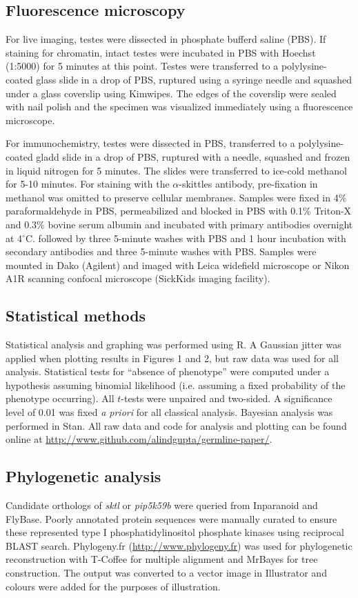 \documentclass[12pt, twoside, letterpaper]{article}
\begin{document}
\subsection{Fluorescence microscopy}
For live imaging, testes were dissected in phosphate bufferd saline (PBS).
If staining for chromatin, intact testes were incubated in PBS with
Hoechst (1:5000) for 5 minutes at this point.
Testes were transferred to a polylysine-coated glass slide in a drop of PBS,
ruptured using a syringe needle and
squashed under a glass coverslip using Kimwipes.
The edges of the coverslip were sealed with nail polish
and the specimen was visualized immediately using a fluorescence microscope.

For immunochemistry, testes were dissected in PBS,
transferred to a polylysine-coated gladd slide in a drop of PBS,
ruptured with a needle, squashed and frozen in liquid nitrogen for 5 minutes.
The slides were transferred to ice-cold methanol for 5-10 minutes.
For staining with the $\alpha$-skittles antibody, pre-fixation in methanol
was omitted to preserve cellular membranes.
Samples were fixed in 4\% paraformaldehyde in PBS,
permeabilized and blocked in PBS with 0.1\% Triton-X and 0.3\% bovine
serum albumin and incubated with primary antibodies overnight at 4$^{\circ}$C.
followed by three 5-minute washes with PBS and 1 hour incubation
with secondary antibodies and three 5-minute washes with PBS.
Samples were mounted in Dako (Agilent) and imaged with Leica widefield microscope
or Nikon A1R scanning confocal microscope (SickKids imaging facility).

\subsection{Statistical methods}
Statistical analysis and graphing was performed using R.
A Gaussian jitter was applied when plotting
results in Figures 1 and 2,
but raw data was used for all analysis.
Statistical tests for ``absence of phenotype'' were computed under a
hypothesis assuming binomial likelihood (i.e. assuming a fixed probability of the
phenotype occurring).
All $t$-tests were unpaired and two-sided.
A significance level of 0.01 was fixed \textit{a priori} for all classical analysis.
Bayesian analysis was performed in Stan.
All raw data and code for analysis and plotting can be found online
at \url{http://www.github.com/alindgupta/germline-paper/}.

\subsection{Phylogenetic analysis}
Candidate orthologs of \textit{sktl} or \textit{pip5k59b} were queried from Inparanoid and FlyBase.
Poorly annotated protein sequences were manually curated to ensure
these represented type I phosphatidylinositol phosphate
kinases using reciprocal BLAST search.
Phylogeny.fr (\url{http://www.phylogeny.fr}) was used for
phylogenetic reconstruction with T-Coffee for multiple alignment
and MrBayes for tree construction.
The output was converted to a vector image in Illustrator
and colours were added for the purposes of illustration.
\end{document}
